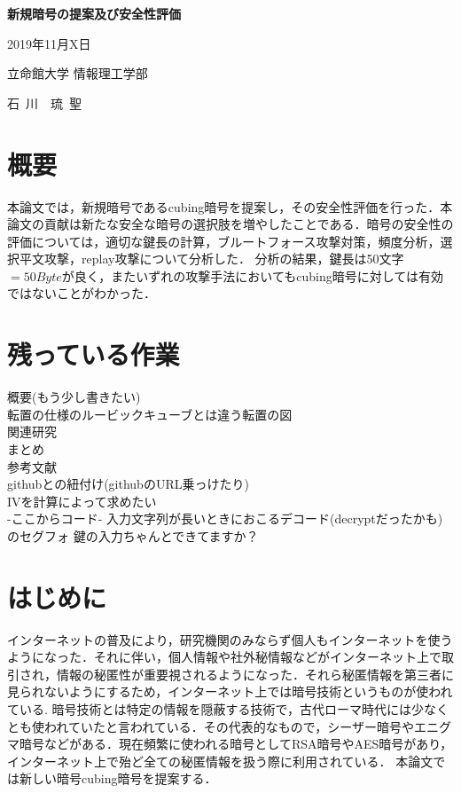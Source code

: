 \documentclass{jsarticle}
\begin{document}
\thispagestyle{empty}
\begin{center}
\vspace*{4.5cm}
{\huge\bf 新規暗号の提案及び安全性評価}
\vspace*{3cm}

{\large 2019年11月X日}
\vspace*{3cm}

{\large 立命館大学 情報理工学部}
\vspace*{5mm}

{\Large 石~川~~琉~聖}
\end{center}
\newpage 

\setcounter{page}{1}

\section*{概要}

本論文では，新規暗号であるcubing暗号を提案し，その安全性評価を行った．本論文の貢献は新たな安全な暗号の選択肢を増やしたことである．暗号の安全性の評価については，適切な鍵長の計算，ブルートフォース攻撃対策，頻度分析，選択平文攻撃，replay攻撃について分析した．
分析の結果，鍵長は50文字$=50Byte$が良く，またいずれの攻撃手法においてもcubing暗号に対しては有効ではないことがわかった．

\newpage

\tableofcontents
\clearpage
\section{残っている作業}
概要(もう少し書きたい)\\
転置の仕様のルービックキューブとは違う転置の図\\
関連研究\\
まとめ\\
参考文献\\
githubとの紐付け(githubのURL乗っけたり)\\
IVを計算によって求めたい\\

-ここからコード-
入力文字列が長いときにおこるデコード(decryptだったかも)のセグフォ
鍵の入力ちゃんとできてますか？

\section{はじめに}

インターネットの普及により，研究機関のみならず個人もインターネットを使うようになった．それに伴い，個人情報や社外秘情報などがインターネット上で取引され，情報の秘匿性が重要視されるようになった．それら秘匿情報を第三者に見られないようにするため，インターネット上では暗号技術というものが使われている.
暗号技術とは特定の情報を隠蔽する技術で，古代ローマ時代には少なくとも使われていたと言われている．\cite{caesar}その代表的なもので，シーザー暗号やエニグマ暗号などがある．現在頻繁に使われる暗号としてRSA暗号やAES暗号があり，インターネット上で殆ど全ての秘匿情報を扱う際に利用されている．
本論文では新しい暗号cubing暗号を提案する．\\
\end{document}
